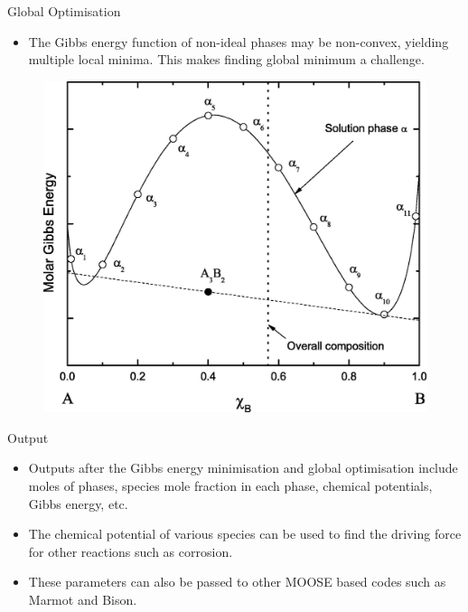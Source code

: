      \begin{frame}{Global Optimisation}
         \begin{itemize}
             \item The Gibbs energy function of non-ideal phases may be non-convex, yielding multiple local minima. This makes finding global minimum a challenge.
         \end{itemize}
         \begin{figure}
             \centering
             \includegraphics[width=0.5\linewidth]{Figures/Global_opt1}
         \end{figure}
     \end{frame}
    

     \begin{frame}{Output}
         \begin{itemize}
             \item Outputs after the Gibbs energy minimisation and global optimisation include moles of phases, species mole fraction in each phase, chemical potentials, Gibbs energy, etc.
             \item The chemical potential of various species can be used to find the driving force for other reactions such as corrosion.
             \item These parameters can also be passed to other MOOSE based codes such as {Marmot} and {Bison}.
         \end{itemize}
     \end{frame}
     
